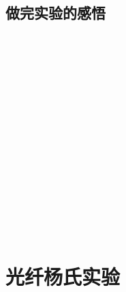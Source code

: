 \documentclass{zjureport}
\begin{document}
  \subsection{做完实验的感悟}
~\\
~\\
~\\
~\\
~\\
~\\
~\\
~\\
~\\
~\\
~\\
~\\
~\\
~\\
~\\
\section{光纤杨氏实验}
\end{document}
